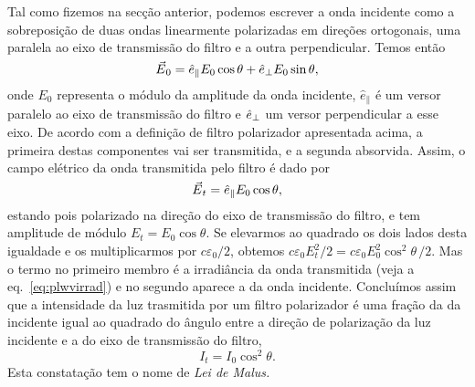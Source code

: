 Tal como fizemos na secção anterior, podemos escrever a onda incidente como a
sobreposição de duas ondas linearmente polarizadas em direções ortogonais, uma
paralela ao eixo de transmissão do filtro e a outra perpendicular. Temos então
\begin{equation*}
\vec E_0= \he_\parallel E_0\cos\theta+\he_\perp E_0\sin\theta,
\end{equation*}
onde $E_0$ representa o módulo da amplitude da onda incidente, $\hat
e_\parallel$ é um versor paralelo ao eixo de transmissão do filtro
e $\hat e_\perp$ um versor perpendicular a esse eixo. De acordo com a
definição de filtro polarizador apresentada acima, a primeira destas
componentes vai ser transmitida, e a segunda absorvida. Assim, o campo elétrico
da onda transmitida pelo filtro é dado por
\begin{equation}\label{eq:analized}
\vec E_t=\he_\parallel E_0\cos\theta,
\end{equation}
estando pois polarizado na direção do eixo de transmissão do filtro, e tem
amplitude de módulo $E_t=E_0\cos\theta$. Se elevarmos ao quadrado os
dois lados desta igualdade e os multiplicarmos por $c\varepsilon_0/2$, obtemos
$c\varepsilon_0 E^2_t/2=c\varepsilon_0 E^2_0\cos^2\theta\,/2$. Mas o
termo no primeiro membro é a irradiância da onda transmitida
(veja a eq.~\eqref{eq:plwvirrad}) e no segundo aparece a da onda incidente.
Concluímos assim que a intensidade da luz trasmitida por um filtro polarizador é
uma fração da da incidente igual ao quadrado do ângulo entre a direção de
polarização da luz incidente e a do eixo de transmissão do filtro,
\begin{equation*}
I_t=I_0\cos^2\theta.
\end{equation*}
Esta constatação tem o nome de \emph{Lei de Malus.}

